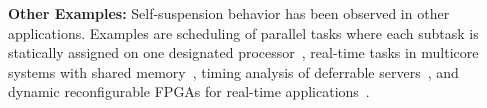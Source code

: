 

{\bf Other Examples:} Self-suspension behavior has been observed in other applications. Examples are scheduling of parallel tasks where each subtask is statically assigned on one designated  processor~\cite{fonseca2016response}, real-time tasks in multicore systems with shared memory~\cite{DBLP:conf/dac/HuangCR16}, timing analysis of deferrable servers~\cite{ChenHLRTSS2015}, and dynamic reconfigurable FPGAs for real-time applications~\cite{DBLP:conf/rtss/BiondiBPRMB16}. 



